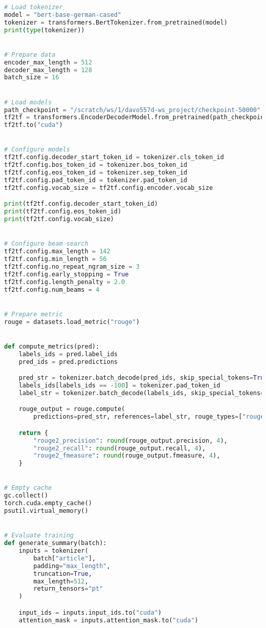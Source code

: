 \begin{lstlisting}[language=Python, caption=Quellcode zur Evaluation]
# Load tokenizer
model = "bert-base-german-cased"
tokenizer = transformers.BertTokenizer.from_pretrained(model)
print(type(tokenizer))


# Prepare data
encoder_max_length = 512
decoder_max_length = 128
batch_size = 16


# Load models
path_checkpoint = "/scratch/ws/1/davo557d-ws_project/checkpoint-50000"
tf2tf = transformers.EncoderDecoderModel.from_pretrained(path_checkpoint)
tf2tf.to("cuda")


# Configure models
tf2tf.config.decoder_start_token_id = tokenizer.cls_token_id
tf2tf.config.bos_token_id = tokenizer.bos_token_id
tf2tf.config.eos_token_id = tokenizer.sep_token_id
tf2tf.config.pad_token_id = tokenizer.pad_token_id
tf2tf.config.vocab_size = tf2tf.config.encoder.vocab_size

print(tf2tf.config.decoder_start_token_id)
print(tf2tf.config.eos_token_id)
print(tf2tf.config.vocab_size)


# Configure beam search
tf2tf.config.max_length = 142
tf2tf.config.min_length = 56
tf2tf.config.no_repeat_ngram_size = 3
tf2tf.config.early_stopping = True
tf2tf.config.length_penalty = 2.0
tf2tf.config.num_beams = 4


# Prepare metric
rouge = datasets.load_metric("rouge")


def compute_metrics(pred):
    labels_ids = pred.label_ids
    pred_ids = pred.predictions

    pred_str = tokenizer.batch_decode(pred_ids, skip_special_tokens=True)
    labels_ids[labels_ids == -100] = tokenizer.pad_token_id
    label_str = tokenizer.batch_decode(labels_ids, skip_special_tokens=True)

    rouge_output = rouge.compute(
        predictions=pred_str, references=label_str, rouge_types=["rouge2"])["rouge2"].mid

    return {
        "rouge2_precision": round(rouge_output.precision, 4),
        "rouge2_recall": round(rouge_output.recall, 4),
        "rouge2_fmeasure": round(rouge_output.fmeasure, 4),
    }


# Empty cache
gc.collect()
torch.cuda.empty_cache()
psutil.virtual_memory()


# Evaluate training
def generate_summary(batch):
    inputs = tokenizer(
        batch["article"],
        padding="max_length",
        truncation=True,
        max_length=512,
        return_tensors="pt"
    )

    input_ids = inputs.input_ids.to("cuda")
    attention_mask = inputs.attention_mask.to("cuda")


\end{lstlisting}

